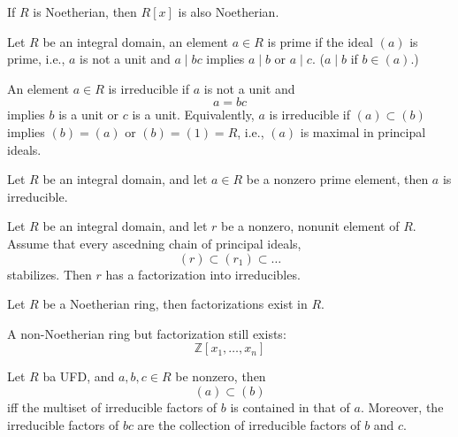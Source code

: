 \documentclass[openany]{book}
\newcommand{\Z}{\mathbb{Z}}
\begin{document}
\begin{prop}
    If $R$ is Noetherian, then $R[x]$ is also Noetherian.
\end{prop}
\begin{defn}
    Let $R$ be an integral domain, an element $a\in R$ is prime if the ideal $(a)$ is prime, i.e., $a$ is not a unit and $a\mid bc$ implies $a\mid b$ or $a\mid c$. ($a\mid b$ if $b\in(a)$.)

    An element $a\in R$ is irreducible if $a$ is not a unit and 
    \begin{equation*}
        a=bc
    \end{equation*}
    implies $b$ is a unit or $c$ is a unit. Equivalently, $a$ is irreducible if $(a)\subset (b)$ implies $(b)=(a)$ or $(b)=(1)=R$, i.e., $(a)$ is maximal in principal ideals.
\end{defn}

\begin{prop}
    Let $R$ be an integral domain, and let $a\in R$ be a nonzero prime element, then $a$ is irreducible.
\end{prop}




\begin{prop}
    Let $R$ be an integral domain, and let $r$ be a nonzero, nonunit element of $R$. Assume that every ascedning chain of principal ideals, 
    \begin{equation*}
        (r)\subset (r_1)\subset\dots
    \end{equation*}
    stabilizes. Then $r$ has a factorization into irreducibles.
\end{prop}

\begin{cor}
    Let $R$ be a Noetherian ring, then factorizations exist in $R$.

    A non-Noetherian ring but factorization still exists:
    \begin{equation*}
        \Z[x_1,\dots,x_n]
    \end{equation*}
\end{cor}




\begin{prop}
    Let $R$ ba UFD, and $a,b,c\in R$ be nonzero, then 
    \begin{equation*}
        (a)\subset(b)
    \end{equation*}
    iff the multiset of irreducible factors of $b$ is contained in that of $a$. Moreover, the irreducible factors of $bc$ are the collection of irreducible factors of $b$ and $c$.
\end{prop}
\end{document}

